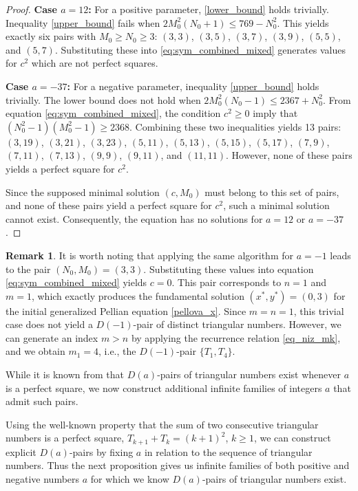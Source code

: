 \documentclass[12pt]{amsart}
\theoremstyle{definition}
\newtheorem*{rem}{Remark}
\begin{document}
\begin{proof}
\textbf{Case $a=12$:} For a positive parameter, \eqref{lower_bound} holds trivially. Inequality \eqref{upper_bound} fails when $2M_0^2(N_0+1) \le 769 - N_0^2$. This yields exactly six pairs with $M_0 \ge N_0 \ge 3$: $(3,3)$, $(3,5)$, $(3,7)$, $(3,9)$, $(5,5)$, and $(5,7)$. Substituting these into \eqref{eq:sym_combined_mixed} generates values for $c^2$ which are not perfect squares.


 \textbf{Case $a=-37$:} For a negative parameter, inequality \eqref{upper_bound} holds trivially. The lower bound does not hold when $2M_0^2(N_0-1) \le 2367 + N_0^2$. From equation \eqref{eq:sym_combined_mixed}, the condition $c^2 \ge 0$ imply that $(N_0^2 - 1) (M_0^2 - 1) \geq 2368$. Combining these two inequalities yields 13 pairs: $(3,19)$, $(3,21)$, $(3,23)$, $(5,11)$, $(5,13)$, $(5,15)$, $(5,17)$, $(7,9)$, $(7,11)$, $(7,13)$, $(9,9)$, $(9,11)$, and $(11,11)$. However, none of these pairs yields a perfect square for $c^2$.

Since the supposed minimal solution $(c, M_0)$ must belong to this set of pairs, and none of these pairs yield a perfect square for $c^2$, such a minimal solution cannot exist. Consequently, the equation has no solutions for $a=12$ or $a=-37$.
\end{proof}

\begin{rem}
It is worth noting that applying the same algorithm for $a=-1$ leads to the pair $(N_0, M_0) = (3,3)$. Substituting these values into equation \eqref{eq:sym_combined_mixed} yields $c=0$. This pair corresponds to $n=1$ and $m=1$, which exactly produces the fundamental solution $(x^*, y^*) = (0,3)$ for the initial generalized Pellian equation \eqref{pellova_x}. Since $m=n=1$, this trivial case does not yield a $D(-1)$-pair of distinct triangular numbers. However, we can generate an index $m>n$ by applying the recurrence relation \eqref{eq_niz_mk}, and we obtain $m_1 = 4$, i.e., the $D(-1)$-pair $\{T_1, T_4\}$.
\end{rem}


While it is known from \cite{mbt_triangular} that $D(a)$-pairs of triangular numbers exist whenever $a$ is a perfect square, we now construct additional infinite families of integers $a$ that admit such pairs. 

Using the well-known property that the sum of two consecutive triangular numbers is a perfect square, $T_{k+1} + T_k = (k+1)^2$, $k\geq 1$, we can construct explicit $D(a)$-pairs by fixing $a$ in relation to the sequence of triangular numbers. Thus the next proposition gives us infinite families of both positive and negative numbers $a$ for which we know $D(a)$-pairs of triangular numbers exist.
\end{document}
